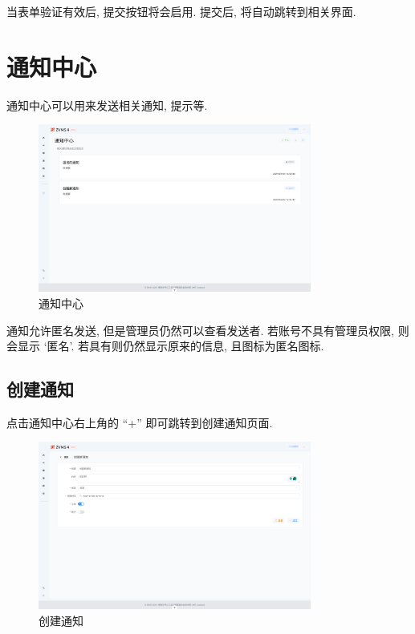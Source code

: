 \documentclass{article}
\begin{document}
当表单验证有效后, 提交按钮将会启用. 提交后, 将自动跳转到相关界面.

\section{通知中心}

\label{sec:notification}

通知中心可以用来发送相关通知, 提示等.

\begin{figure}[H]
  \centering
  \includegraphics[width=0.8\textwidth]{../assets/image-20240303165112077.png}
  \caption{通知中心}
  \label{fig:notification}
\end{figure}

通知允许匿名发送, 但是管理员仍然可以查看发送者. 若账号不具有管理员权限, 则会显示 `匿名'. 若具有则仍然显示原来的信息, 且图标为匿名图标.

\subsection{创建通知}

点击通知中心右上角的 ``+'' 即可跳转到创建通知页面.

\begin{figure}[H]
  \centering
  \includegraphics[width=0.8\textwidth]{../assets/image-20240303164619976.png}
  \caption{创建通知}
  \label{fig:notification-create}
\end{figure}
\end{document}
